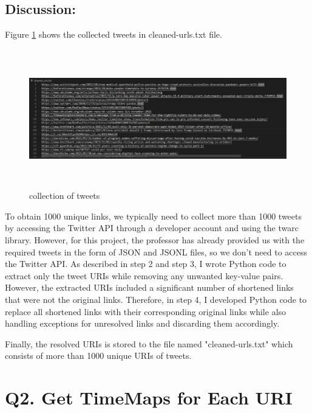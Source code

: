 \documentclass[12pt]{article}
\begin{document}
\subsection*{Discussion:}

Figure \ref{fig:cleaned-urls} shows the collected tweets in cleaned-urls.txt file.

\begin{figure}[h]
    \centering
    \includegraphics[trim=0 20 10 50, clip, width=\textwidth,height=6cm] {urls.jpg}
    \caption{collection of tweets}
    \label{fig:cleaned-urls}
\end{figure}

To obtain 1000 unique links, we typically need to collect more than 1000 tweets by accessing the Twitter API through a developer account and using the twarc library. However, for this project, the professor has already provided us with the required tweets in the form of JSON and JSONL files, so we don't need to access the Twitter API. As described in step 2 and step 3, I wrote Python code to extract only the tweet URIs while removing any unwanted key-value pairs. However, the extracted URIs included a significant number of shortened links that were not the original links. Therefore, in step 4, I developed Python code to replace all shortened links with their corresponding original links while also handling exceptions for unresolved links and discarding them accordingly.

Finally, the resolved URIs is stored to the file named "cleaned-urls.txt" which consists of more than 1000 unique URIs of tweets.




\section*{Q2. Get TimeMaps for Each URI}
\end{document}
